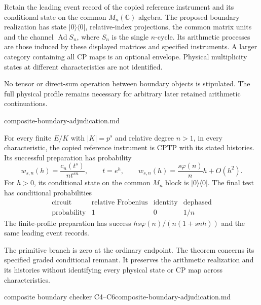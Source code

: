 \begin{definition}
Retain the leading event record of the copied reference instrument and
its conditional state on the common $M_n(\mathbb C)$ algebra. The proposed
boundary realization has state $|0\rangle\langle0|$, relative-index
projections, the common matrix units and the channel $\operatorname{Ad}S_n$,
where $S_n$ is the single $n$-cycle. Its arithmetic processes are those
induced by these displayed matrices and specified instruments. A larger
category containing all CP maps is an optional envelope. Physical
multiplicity states at different characteristics are not identified.
\end{definition}
\begin{scope}
No tensor or direct-sum operation between boundary objects is stipulated.
The full physical profile remains necessary for arbitrary later retained
arithmetic continuations.
\end{scope}
{composite-boundary-adjudication.md}

\begin{theorem}
\statusSketch\quad
For every finite $E/K$ with $|K|=p^s$ and relative degree $n>1$, in every
characteristic, the copied reference instrument is CPTP with its stated
histories. Its successful preparation has probability
\[
 w_{s,n}(h)=\frac{c_n(t^s)}{n t^{sn}},\qquad t=e^h,
 \qquad w_{s,n}(h)=\frac{s\varphi(n)}n h+O(h^2).
\]
For $h>0$, its conditional state on the common $M_n$ block is
$|0\rangle\langle0|$. The final test has conditional probabilities
\[
 \begin{array}{c|ccc}
 \text{circuit}&\text{relative Frobenius}&\text{identity}&\text{dephased}\\\hline
 \text{probability}&1&0&1/n
 \end{array}
\]
The finite-profile preparation has success
$h s\varphi(n)/(n(1+snh))$ and the same leading event records.
\end{theorem}
\begin{scope}
The primitive branch is zero at the ordinary endpoint. The theorem
concerns its specified graded conditional remnant. It preserves the
arithmetic realization and its histories without identifying every
physical state or CP map across characteristics.
\end{scope}
{composite boundary checker C4--C6}{composite-boundary-adjudication.md}

